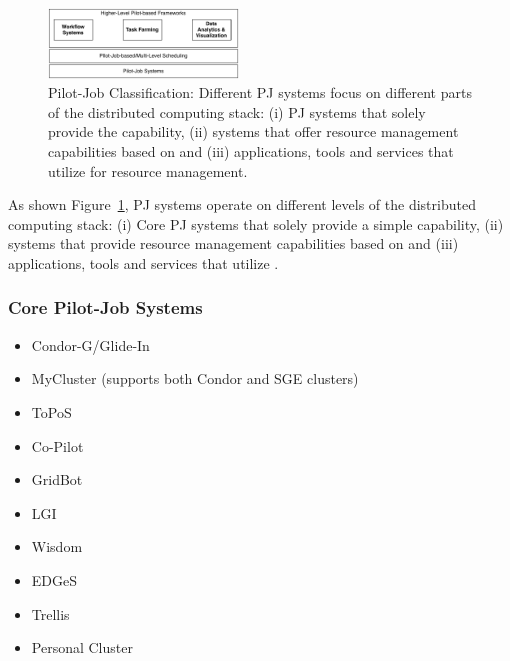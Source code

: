 \documentclass{sig-alternate}
\begin{document}
\begin{figure}[t]
	\centering
		\includegraphics[width=0.45\textwidth]{figures/classification}
	\caption{Pilot-Job Classification: Different PJ systems focus
          on different parts of the distributed computing stack: (i)
          PJ systems that solely provide the \pilot capability, (ii)
          systems that offer resource management capabilities based on
          \pilots and (iii) applications, tools and services that
          utilize \pilots for resource management. }
	\label{fig:figures_classification}
\end{figure}


As shown Figure~\ref{fig:figures_classification}, PJ systems operate on
different levels of the distributed computing stack: (i) Core PJ systems that
solely provide a simple \pilot capability, (ii) systems that provide resource
management capabilities based on \pilots and (iii) applications, tools and
services that utilize \pilots. 



\subsubsection*{Core Pilot-Job Systems}

\begin{itemize}
	\item Condor-G/Glide-In
	\item MyCluster (supports both Condor and SGE clusters)
	\item ToPoS 
	\item Co-Pilot
	\item GridBot~\cite{Silberstein:2009:GEB:1654059.1654071}
	\item LGI
	\item Wisdom
	\item EDGeS
	\item Trellis
	\item Personal Cluster
\end{itemize}
\end{document}
